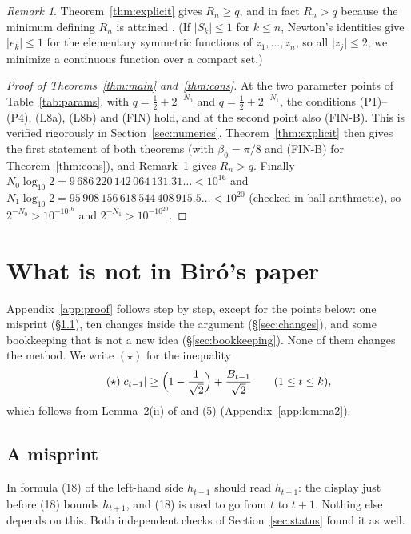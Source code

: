\documentclass[11pt]{amsart}
\theoremstyle{remark}
\newtheorem{remark}[theorem]{Remark}
\theoremstyle{plain}
\newcommand{\abs}[1]{\lvert #1\rvert}
\begin{document}
\begin{remark}\label{rem:attained}
Theorem~\ref{thm:explicit} gives $R_n\ge q$, and in fact $R_n>q$ because the minimum defining $R_n$ is attained \cite[\S1]{Bir00b}. (If $\abs{S_k}\le1$ for $k\le n$, Newton's identities give $\abs{e_k}\le1$ for the elementary symmetric functions of $z_1,\dots,z_n$, so all $\abs{z_j}\le2$; we minimize a continuous function over a compact set.)
\end{remark}

\begin{proof}[Proof of Theorems~\ref{thm:main} and~\ref{thm:cons}]
At the two parameter points of Table~\ref{tab:params}, with $q=\frac12+2^{-N_0}$ and $q=\frac12+2^{-N_1}$, the conditions (P1)--(P4), (L8a), (L8b) and (FIN) hold, and at the second point also (FIN-B). This is verified rigorously in Section~\ref{sec:numerics}. Theorem~\ref{thm:explicit} then gives the first statement of both theorems (with $\beta_0=\pi/8$ and (FIN-B) for Theorem~\ref{thm:cons}), and Remark~\ref{rem:attained} gives $R_n>q$. Finally $N_0\log_{10}2=9\,686\,220\,142\,064\,131.31\ldots<10^{16}$ and $N_1\log_{10}2=95\,908\,156\,618\,544\,408\,915.5\ldots<10^{20}$ (checked in ball arithmetic), so $2^{-N_0}>10^{-10^{16}}$ and $2^{-N_1}>10^{-10^{20}}$.
\end{proof}

\section{What is not in Bir\'o's paper}\label{sec:new}

Appendix~\ref{app:proof} follows \cite{Bir00b} step by step, except for the points below: one misprint (\S\ref{sec:misprint}), ten changes inside the argument (\S\ref{sec:changes}), and some bookkeeping that is not a new idea (\S\ref{sec:bookkeeping}). None of them changes the method. We write $(\star)$ for the inequality
\begin{equation}\tag{$\star$}
  \abs{c_{t-1}}\ge\Bigl(1-\frac1{\sqrt2}\Bigr)+\frac{B_{t-1}}{\sqrt2}\qquad(1\le t\le k),
\end{equation}
which follows from Lemma~2(ii) of \cite{Bir00b} and (5) (Appendix~\ref{app:lemma2}).

\subsection{A misprint}\label{sec:misprint}
In formula (18) of \cite{Bir00b} the left-hand side $h_{t-1}$ should read $h_{t+1}$: the display just before (18) bounds $h_{t+1}$, and (18) is used to go from $t$ to $t+1$. Nothing else depends on this. Both independent checks of Section~\ref{sec:status} found it as well.
\end{document}
